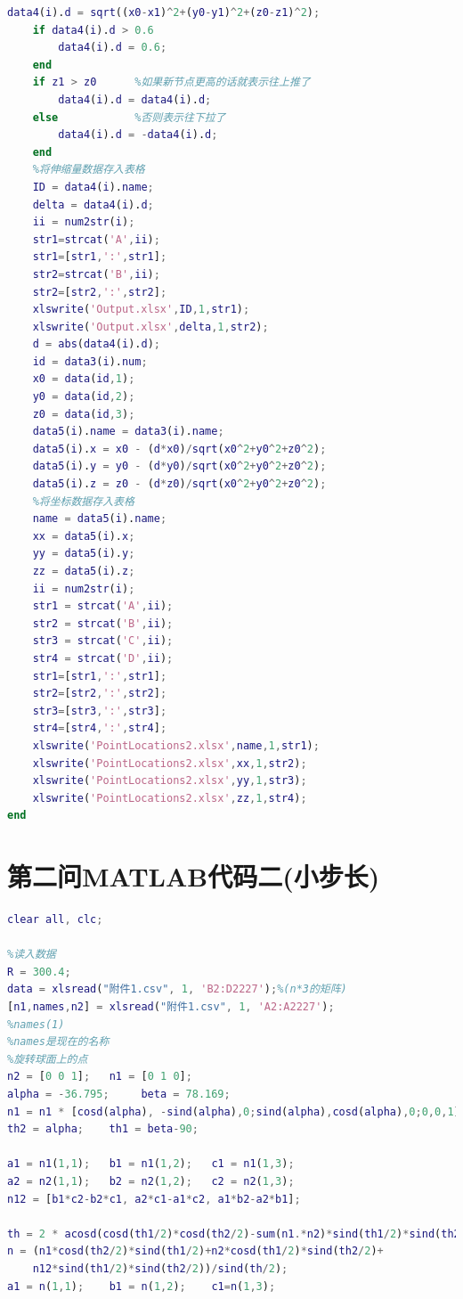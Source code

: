 \documentclass[withoutpreface,bwprint]{cumcmthesis} %
\begin{document}
\begin{appendices}
\begin{lstlisting}[language=matlab]
    data4(i).d = sqrt((x0-x1)^2+(y0-y1)^2+(z0-z1)^2);
    if data4(i).d > 0.6
        data4(i).d = 0.6;
    end
    if z1 > z0      %如果新节点更高的话就表示往上推了
        data4(i).d = data4(i).d;
    else            %否则表示往下拉了
        data4(i).d = -data4(i).d;
    end
    %将伸缩量数据存入表格
    ID = data4(i).name;
    delta = data4(i).d;
    ii = num2str(i);
    str1=strcat('A',ii);
    str1=[str1,':',str1];
    str2=strcat('B',ii);
    str2=[str2,':',str2];
    xlswrite('Output.xlsx',ID,1,str1);
    xlswrite('Output.xlsx',delta,1,str2);
    d = abs(data4(i).d);
    id = data3(i).num;
    x0 = data(id,1);
    y0 = data(id,2);
    z0 = data(id,3);
    data5(i).name = data3(i).name;
    data5(i).x = x0 - (d*x0)/sqrt(x0^2+y0^2+z0^2);
    data5(i).y = y0 - (d*y0)/sqrt(x0^2+y0^2+z0^2);
    data5(i).z = z0 - (d*z0)/sqrt(x0^2+y0^2+z0^2);
    %将坐标数据存入表格
    name = data5(i).name;
    xx = data5(i).x;
    yy = data5(i).y;
    zz = data5(i).z;
    ii = num2str(i);
    str1 = strcat('A',ii);
    str2 = strcat('B',ii);
    str3 = strcat('C',ii);
    str4 = strcat('D',ii);
    str1=[str1,':',str1];
    str2=[str2,':',str2];
    str3=[str3,':',str3];
    str4=[str4,':',str4];
    xlswrite('PointLocations2.xlsx',name,1,str1);
    xlswrite('PointLocations2.xlsx',xx,1,str2);
    xlswrite('PointLocations2.xlsx',yy,1,str3);
    xlswrite('PointLocations2.xlsx',zz,1,str4);
end

\end{lstlisting}
\section{第二问MATLAB代码二(小步长)}
\begin{lstlisting}[language=matlab]
clear all, clc;

%读入数据
R = 300.4;
data = xlsread("附件1.csv", 1, 'B2:D2227');%(n*3的矩阵)
[n1,names,n2] = xlsread("附件1.csv", 1, 'A2:A2227');
%names(1)
%names是现在的名称
%旋转球面上的点
n2 = [0 0 1];   n1 = [0 1 0];   
alpha = -36.795;     beta = 78.169;
n1 = n1 * [cosd(alpha), -sind(alpha),0;sind(alpha),cosd(alpha),0;0,0,1]
th2 = alpha;    th1 = beta-90;

a1 = n1(1,1);   b1 = n1(1,2);   c1 = n1(1,3);
a2 = n2(1,1);   b2 = n2(1,2);   c2 = n2(1,3);
n12 = [b1*c2-b2*c1, a2*c1-a1*c2, a1*b2-a2*b1];

th = 2 * acosd(cosd(th1/2)*cosd(th2/2)-sum(n1.*n2)*sind(th1/2)*sind(th2/2));
n = (n1*cosd(th2/2)*sind(th1/2)+n2*cosd(th1/2)*sind(th2/2)+
    n12*sind(th1/2)*sind(th2/2))/sind(th/2);
a1 = n(1,1);    b1 = n(1,2);    c1=n(1,3);


\end{lstlisting}
\end{appendices}
\end{document}
